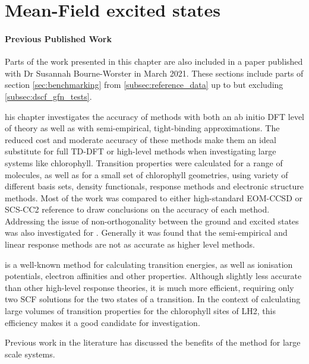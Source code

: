 %
%
\chapter{Mean-Field excited states}
\label{chap:dscf}

\subsubsection*{Previous Published Work}
Parts of the work presented in this chapter are also included in a paper published 
with Dr Susannah Bourne-Worster in March 2021\cite{Worster2021}. These sections
include parts of section \ref{sec:benchmarking} from \ref{subsec:reference_data}
up to but excluding \ref{subsec:dscf_gfn_tests}.

his chapter investigates the accuracy of \dscf methods with  both an 
ab initio DFT level of theory as well as with semi-empirical, tight-binding
approximations. The reduced cost and moderate accuracy of these methods
make them an ideal substitute for full TD-DFT or high-level methods when investigating
large systems like chlorophyll.
Transition properties were calculated for a range of molecules, as well as
for a small set of chlorophyll geometries, using variety of different basis sets,
density functionals, response methods and electronic structure methods. Most of 
the work was compared to either high-standard EOM-CCSD or SCS-CC2 reference to
draw conclusions on the accuracy of each method. Addressing the issue of non-orthogonality 
between the ground and excited states was also investigated for \dscf. Generally
it was found that the semi-empirical \dscf and linear response methods are not as
accurate as higher level methods.

\dscf is a well-known method for calculating transition energies, as well as
ionisation potentials, electron affinities and other properties. Although slightly
less accurate than other high-level response theories, it is much more efficient,
requiring only two SCF solutions for the two states of a transition. In the context 
of calculating large volumes of transition properties for the chlorophyll sites of
LH2, this efficiency makes it a good candidate for investigation.

Previous work in the literature has discussed the benefits of the \dscf method for 
large scale systems.

